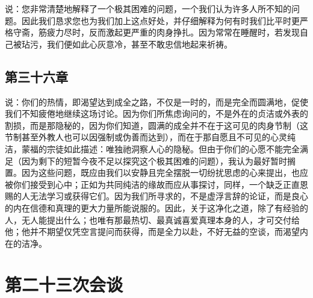 说：您非常清楚地解释了一个极其困难的问题，一个我们认为许多人所不知的问题。因此我们恳求您也为我们加上这点好处，并仔细解释为何有时我们比平时更严格守斋，筋疲力尽时，反而激起更严重的肉身挣扎。因为常常在睡醒时，若发现自己被玷污，我们便如此心灰意冷，甚至不敢忠信地起来祈祷。\par


\subsection{第三十六章}

\par

说：你们的热情，即渴望达到成全之路，不仅是一时的，而是完全而圆满地，促使我们不知疲倦地继续这场讨论。因为你们所焦虑询问的，不是外在的贞洁或外表的割损，而是那隐秘的，因为你们知道，圆满的成全并不在于这可见的肉身节制（这节制甚至外教人也可以因强制或伪善而达到），而在于那自愿且不可见的心灵纯洁，蒙福的宗徒如此描述：唯独祂洞察人心的隐秘。但由于你们的心愿不能完全满足（因为剩下的短暂今夜不足以探究这个极其困难的问题），我认为最好暂时搁置。因为这些问题，既应由我们以安静且完全摆脱一切纷扰思虑的心来提出，也应被你们接受到心中；正如为共同纯洁的缘故而应从事探讨，同样，一个缺乏正直恩赐的人无法学习或获得它们。因为我们所寻求的，不是虚浮言辞的论证，而是良心的内在信德和真理的更大力量所能说服的。因此，关于这净化之道，除了有经验的人，无人能提出什么；也唯有那最热切、最真诚喜爱真理本身的人，才可交付给他；他并不期望仅凭空言提问而获得，而是全力以赴，不好无益的空谈，而渴望内在的洁净。\par



\section{第二十三次会谈}


